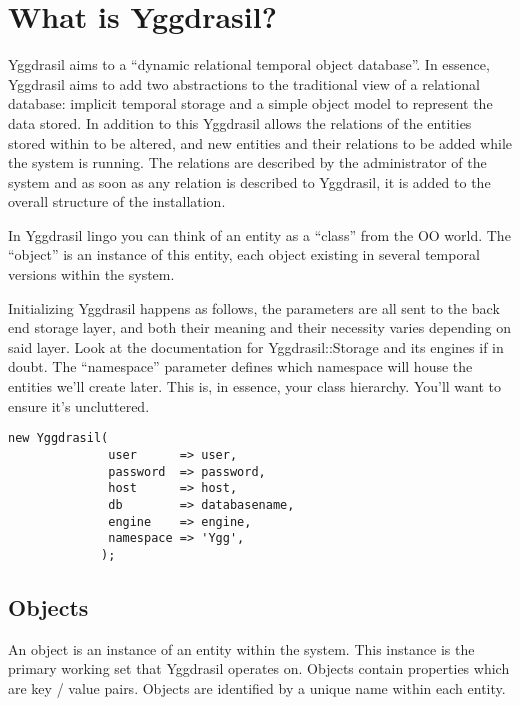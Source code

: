 \documentclass[english,a4paper]{article}
\begin{document}


\tableofcontents

\newpage

\section{What is Yggdrasil?}

Yggdrasil aims to a ``dynamic relational temporal object database''.
In essence, Yggdrasil aims to add two abstractions to the traditional
view of a relational database: implicit temporal storage and a simple
object model to represent the data stored.  In addition to this
Yggdrasil allows the relations of the entities stored within to be
altered, and new entities and their relations to be added while the
system is running.  The relations are described by the administrator
of the system and as soon as any relation is described to Yggdrasil,
it is added to the overall structure of the installation.  

In Yggdrasil lingo you can think of an entity as a ``class'' from the
OO world.  The ``object'' is an instance of this entity, each object
existing in several temporal versions within the system.

Initializing Yggdrasil happens as follows, the parameters are all sent
to the back end storage layer, and both their meaning and their
necessity varies depending on said layer.  Look at the documentation
for Yggdrasil::Storage and its engines if in doubt.  The ``namespace''
parameter defines which namespace will house the entities we'll create
later.  This is, in essence, your class hierarchy.  You'll want to
ensure it's uncluttered.  

\lstset{caption=Initializing Yggrasil,label=ygginit,float=tp,aboveskip=0.7cm}
\begin{lstlisting}
new Yggdrasil(
              user      => user,
              password  => password,
              host      => host,
              db        => databasename,
              engine    => engine,
              namespace => 'Ygg',
             );
\end{lstlisting}

\subsection{Objects}

An object is an instance of an entity within the system.  This
instance is the primary working set that Yggdrasil operates on.
Objects contain properties which are key / value pairs.  Objects are
identified by a unique name within each entity.
\end{document}
